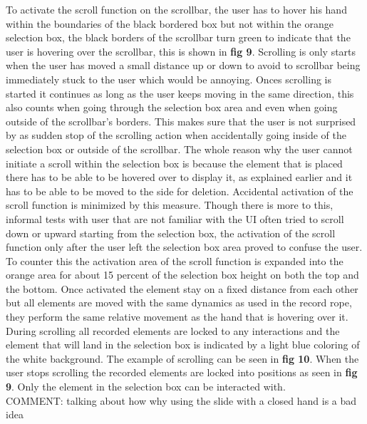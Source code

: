 To activate the scroll function on the scrollbar, the user has to hover his hand within the boundaries of the black bordered box but not within the orange selection box, the black borders of the scrollbar turn green to indicate that the user is hovering over the scrollbar, this is shown in \textbf{ fig 9}. Scrolling is only starts when the user has moved a small distance up or down to avoid to scrollbar being immediately stuck to the user which would be annoying. Onces scrolling is started it continues as long as the user keeps moving in the same direction, this also counts when going through the selection box area and even when going outside of the scrollbar's borders. This makes sure that the user is not surprised by as sudden stop of the scrolling action when accidentally going inside of the selection box or outside of the scrollbar. The whole reason why the user cannot initiate a scroll within the selection box is because the element that is placed there has to be able to be hovered over to display it, as explained earlier and it has to be able to be moved to the side for deletion. Accidental activation of the scroll function is minimized by this measure. Though there is more to this, informal tests with user that are not familiar with the UI often tried to scroll down or upward starting from the selection box, the activation of the scroll function only after the user left the selection box area proved to confuse the user. To counter this the activation area of the scroll function is expanded into the orange area for about 15 percent of the selection box height on both the top and the bottom. Once activated the element stay on a fixed distance from each other but all elements are moved with the same dynamics as used in the record rope, they perform the same relative movement as the hand that is hovering over it. During scrolling all recorded elements are locked to any interactions and the element that will land in the selection box is indicated by a light blue coloring of the white background. The example of scrolling can be seen in \textbf{ fig 10}. When the user stops scrolling the recorded elements are locked into positions as seen in \textbf{ fig 9}. Only the element in the selection box can be interacted with.\\

{\large COMMENT: talking about how why using the slide with a closed hand is a bad idea} \\

